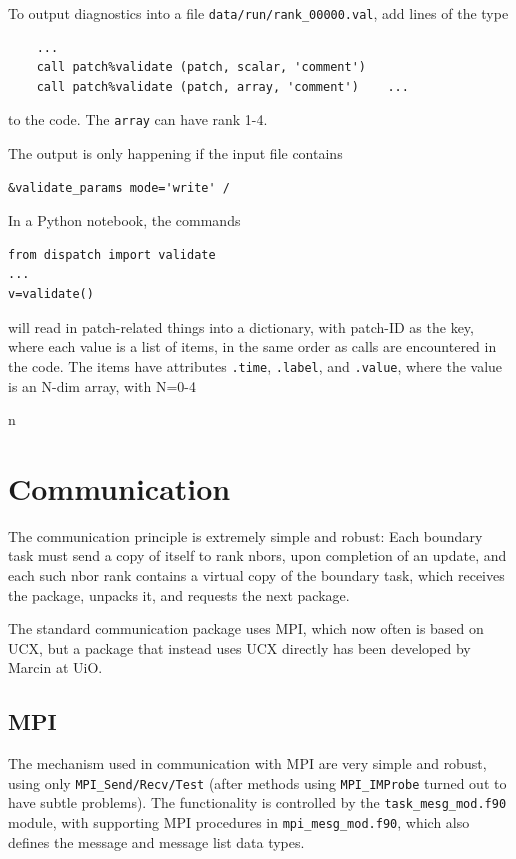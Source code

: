 \documentclass[paper=a4,fontsize=11pt]{scrartcl}
\numberwithin{equation}{section}		%
\numberwithin{figure}{section}			%
\numberwithin{table}{section}				%
\newcommand{\codecolor}{\color{Blue}}
\newcommand{\filecolor}{\color{NavyBlue}}
\newcommand{\File}[1]{{\filecolor\texttt{#1}}}
\newcommand{\Code}[1]{{\codecolor\texttt{#1}}}
\begin{document}
To output diagnostics into a file \File{data/run/rank\_00000.val}, add lines of the type
{\codecolor \begin{verbatim}
    ...
    call patch%validate (patch, scalar, 'comment')
    call patch%validate (patch, array, 'comment')    ...
\end{verbatim}}
to the code.  The \Code{array} can have rank 1-4.

The output is only happening if the input file contains
{\filecolor \begin{verbatim}
&validate_params mode='write' /
\end{verbatim}}

In a Python notebook, the commands
{\codecolor \begin{verbatim}
from dispatch import validate
...
v=validate()\end{verbatim}}
 will read in patch-related things into a dictionary, with patch-ID as the key, where each value is a list of items, in the same order as calls are encountered in the code.  The items have attributes \Code{.time}, \Code{.label}, and \Code{.value}, where the value is an N-dim array, with N=0-4


n\section{Communication}
The communication principle is extremely simple and robust:  Each boundary task must send a copy of itself to rank nbors, upon completion of an update, and each such nbor rank contains a virtual copy of the boundary task, which receives the package, unpacks it, and requests the next package.

The standard communication package uses MPI, which now often is based on UCX, but a package that instead uses UCX directly has been developed by Marcin at UiO.

\subsection{MPI}
The mechanism used in communication with MPI are very simple and robust, using only \Code{MPI\_Send/Recv/Test} (after methods using \Code{MPI\_IMProbe} turned out to have subtle problems).  The functionality is controlled by the \Code{task\_mesg\_mod.f90} module, with supporting MPI procedures in \Code{mpi\_mesg\_mod.f90}, which also defines the message and message list data types.
\end{document}

